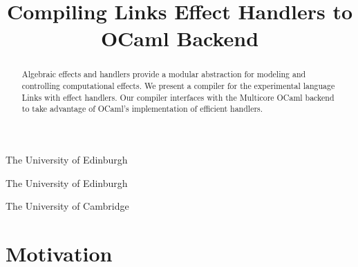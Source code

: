 \documentclass[preprint,numbers]{sigplanconf}
\newcommand{\msgbox}[2]{{%
  \par\noindent\small\color{red}%
  \framebox{\parbox{\dimexpr\linewidth-2\fboxsep-2\fboxrule}{\textbf{#1:} #2}}%
}}
\newcommand{\sam}[1]{\msgbox{Sam}{#1}}
\newcommand{\kc}[1]{\msgbox{KC}{#1}}
\begin{document}
\makeatletter
\def\@copyrightspace{\relax}
\makeatother

\setlength{\pdfpageheight}{\paperheight}
\setlength{\pdfpagewidth}{\paperwidth}

\newcommand{\camacuk}{@cam.ac.uk}
\newcommand{\edacuk}{@ed.ac.uk}
\newcommand{\contact}[2]{#1@#2}
\newcommand{\reachme}[1]{\hyperlink{mailto:\contact{#1}}{\contact{#1}}}

\preprintfooter{} %

\title{Compiling Links Effect Handlers to OCaml Backend}
           {The University of Edinburgh}
           {~}%

           {The University of Edinburgh}
           {~}%

           {The University of Cambridge}
           {~}

\maketitle

\begin{abstract}
  Algebraic effects and handlers provide a modular abstraction for
  modeling and controlling computational effects. We present a
  compiler for the experimental language Links with effect
  handlers. Our compiler interfaces with the Multicore OCaml backend
  to take advantage of OCaml's implementation of efficient handlers.
\end{abstract}

\section{Motivation}

\end{document}
